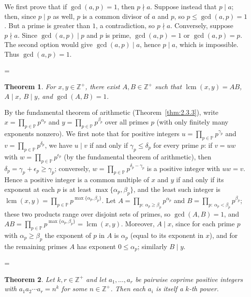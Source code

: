 \documentclass[11pt]{article}
\makeatletter
\theoremstyle{ntstyle}
\newtheorem{theorem}{Theorem}[subsection]
\let\nt@closedisplay\]
\def\nt@guardedclose{\@ifnextchar\par{\nt@closeafterpar}{\@ifnextchar\end{\postdisplaypenalty\@M\nt@closedisplay}{\nt@closedisplay}}}
\def\nt@closeafterpar\par{\@ifnextchar\par{\nt@closeafterpar}{\@ifnextchar\end{\postdisplaypenalty\@M\nt@closedisplay\par}{\nt@closedisplay\par}}}
\renewenvironment{proof}[1][\proofname]{\par
  \pushQED{\qed}\normalfont\topsep\medskipamount\edef\nt@afterproof{\@endparpenalty=\the\@endparpenalty\relax}\@beginparpenalty\@M\@endparpenalty\@M\let\]\nt@guardedclose\trivlist\item[]\textit{#1\@addpunct{.}} \ignorespaces}{\ifvmode\addpenalty\@M\fi\popQED\nt@afterproof\endtrivlist\@endpefalse}
\newcommand{\Primes}{\mathbb{P}}
\DeclareMathOperator{\lcm}{lcm}
\makeatother
\begin{document}
\begin{proof} We first prove that if $\gcd(a, p) = 1$,
	then $p \nmid a$. Suppose instead that $p \mid a$; then, since $p
		\mid p$ as well, $p$ is a common divisor of $a$ and $p$, so $p \le
		\gcd(a, p) = 1$. But a prime is greater than $1$, a contradiction, so
	$p \nmid a$. Conversely, suppose $p \nmid a$. Since
	$\gcd(a, p) \mid p$ and $p$ is prime, $\gcd(a, p) = 1$ or $\gcd(a, p)
		= p$. The second option would give $\gcd(a, p) \mid a$, hence $p \mid a$,
	which is impossible. Thus $\gcd(a, p) = 1$.

\end{proof}
\begin{theorem}\label{thm:2.3.5} For $x, y \in \mathbb{Z}^+$,
	there exist $A, B \in \mathbb{Z}^+$ such that
	$\lcm(x, y) = AB$, $A \mid x$, $B \mid y$, and $\gcd(A, B) = 1$.

\end{theorem}

\begin{proof} By the fundamental theorem of arithmetic (Theorem~\ref{thm:2.3.3}),
	write $x = \prod_{p\in\Primes} p^{\alpha_p}$ and $y = \prod_{p\in\Primes}
		p^{\beta_p}$ over all primes $p$ (with only finitely many exponents
	nonzero). We first note that for positive integers $u = \prod_{p\in\Primes}
		p^{\gamma_p}$ and $v = \prod_{p\in\Primes} p^{\delta_p}$, we have $u \mid v$ if and only if
	$\gamma_p \le \delta_p$ for every prime $p$: if $v = uw$ with $w =
		\prod_{p\in\Primes} p^{\epsilon_p}$ (by the fundamental theorem of arithmetic), then $\delta_p = \gamma_p + \epsilon_p
		\ge \gamma_p$; conversely, $w = \prod_{p\in\Primes} p^{\delta_p - \gamma_p}$ is a
	positive integer with $uw = v$. Hence a positive integer is a common
	multiple of $x$ and $y$ if and only if its exponent at each $p$ is at least
		$\max\{\alpha_p, \beta_p\}$, and the least such integer is
	$\lcm(x, y) = \prod_{p\in\Primes} p^{\max\{\alpha_p, \beta_p\}}$. Let
	$A = \prod_{p:\ \alpha_p \ge \beta_p} p^{\alpha_p}$ and $B =
		\prod_{p:\ \alpha_p < \beta_p} p^{\beta_p}$; these two products range
	over disjoint sets of primes, so $\gcd(A, B) = 1$, and $AB = \prod_{p\in\Primes}
		p^{\max\{\alpha_p, \beta_p\}} = \lcm(x, y)$. Moreover, $A
		\mid x$, since for each prime $p$ with $\alpha_p \ge \beta_p$ the
	exponent of $p$ in $A$ is $\alpha_p$ (equal to its exponent in $x$),
	and for the remaining primes $A$ has exponent $0 \le \alpha_p$;
	similarly $B \mid y$.

\end{proof}
\begin{theorem}\label{thm:2.3.6} Let $k,r\in\mathbb{Z}^+$ and let
	$a_1,\ldots,a_r$ be pairwise coprime
	positive integers with $a_1a_2\cdots a_r=n^{k}$ for some
	$n\in\mathbb{Z}^+$. Then each $a_i$ is itself a $k$-th power.

\end{theorem}
\end{document}
